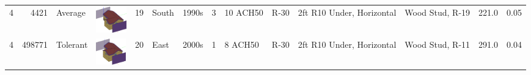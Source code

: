\begin{tabular}{rrllrlllllllrr}
 4 & 4421 & Average & {\includegraphics[height=0.45in]{figures/building_geometry/4421}} & 19 & South & 1990s & 3 & 10 ACH50 & R-30 & 2ft R10 Under, Horizontal & Wood Stud, R-19 & 221.0 & 0.05 \\
 4 & 498771 & Tolerant & {\includegraphics[height=0.45in]{figures/building_geometry/498771}} & 20 & East & 2000s & 1 & 8 ACH50 & R-30 & 2ft R10 Under, Horizontal & Wood Stud, R-11 & 291.0 & 0.04 \\
\bottomrule
\end{tabular}
